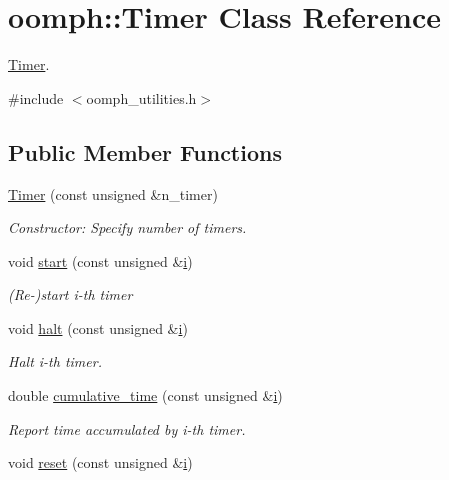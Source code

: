 \hypertarget{classoomph_1_1Timer}{}\section{oomph\+:\+:Timer Class Reference}
\label{classoomph_1_1Timer}


\hyperlink{classoomph_1_1Timer}{Timer}.  




{\ttfamily \#include $<$oomph\+\_\+utilities.\+h$>$}

\subsection*{Public Member Functions}
\begin{DoxyCompactItemize}
\item 
\hyperlink{classoomph_1_1Timer_a8abb0baeaa25a08ac1b31c1147aac92e}{Timer} (const unsigned \&n\+\_\+timer)
\begin{DoxyCompactList}\small\item\em Constructor\+: Specify number of timers. \end{DoxyCompactList}\item 
void \hyperlink{classoomph_1_1Timer_aee7db2917caed661ba067c8d10b7e033}{start} (const unsigned \&\hyperlink{cfortran_8h_adb50e893b86b3e55e751a42eab3cba82}{i})
\begin{DoxyCompactList}\small\item\em (Re-\/)start i-\/th timer \end{DoxyCompactList}\item 
void \hyperlink{classoomph_1_1Timer_afa34218cf8b9badba4f3c59ce004962b}{halt} (const unsigned \&\hyperlink{cfortran_8h_adb50e893b86b3e55e751a42eab3cba82}{i})
\begin{DoxyCompactList}\small\item\em Halt i-\/th timer. \end{DoxyCompactList}\item 
double \hyperlink{classoomph_1_1Timer_a77dfee0aa6e15ec95095f76a1f1b91c0}{cumulative\+\_\+time} (const unsigned \&\hyperlink{cfortran_8h_adb50e893b86b3e55e751a42eab3cba82}{i})
\begin{DoxyCompactList}\small\item\em Report time accumulated by i-\/th timer. \end{DoxyCompactList}\item 
void \hyperlink{classoomph_1_1Timer_ad2980c89ce68bb41d42328e72ce96db4}{reset} (const unsigned \&\hyperlink{cfortran_8h_adb50e893b86b3e55e751a42eab3cba82}{i})

\end{DoxyCompactItemize}

